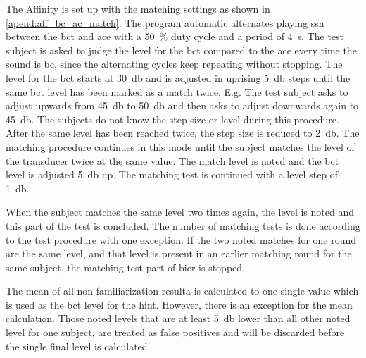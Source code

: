 The Affinity is set up with the matching settings as shown in \autoref{apend:aff_bc_ac_match}. The program automatic alternates playing \gls{ssn} between the \gls{bct} and \gls{ace} with a \SI{50}{\percent} duty cycle and a period of \SI{4}{\second}. The test subject is asked to judge the level for the \gls{bct} compared to the \gls{ace} every time the sound is \gls{bc}, since the alternating cycles keep repeating without stopping. The level for the \gls{bct} starts at \SI{30}{\decibel} and is adjusted in uprising \SI{5}{\decibel} steps until the same \gls{bct} level has been marked as a match twice. E.g. The test subject asks to adjust upwards from \SI{45}{\decibel} to \SI{50}{\decibel} and then asks to adjust downwards again to \SI{45}{\decibel}. The subjects do not know the step size or level during this procedure. 
After the same level has been reached twice, the step size is reduced to \SI{2}{\decibel}. The matching procedure continues in this mode until the subject matches the level of the transducer twice at the same value. The match level is noted and the  \gls{bct} level is adjusted \SI{5}{\decibel} up. The matching test is continued with a level step of \SI{1}{\decibel}.

When the subject matches the same level two times again, the level is noted and this part of the test is concluded. The number of matching tests is done according to the test procedure with one exception. If the two noted matches for one round are the same level, and that level is present in an earlier matching round for the same subject, the matching test part of \gls{bier} is stopped. 

The mean of all non familiarization resulta is calculated to one single value which is used as the \gls{bct} level for the \gls{hint}. However, there is an exception for the mean calculation. Those noted levels that are at least \SI{5}{\decibel} lower than all other noted level for one subject, are treated as false positives and will be discarded before the single final level is calculated. 



